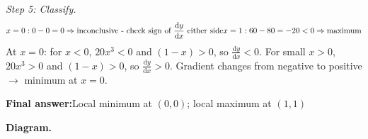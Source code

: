 \documentclass[11pt]{article}
\begin{document}
\textit{Step 5: Classify.}
\[\begin{gathered}
x=0: 0 - 0 = 0 \Rightarrow \text{inconclusive - check sign of } \frac{\mathrm{d}y}{\mathrm{d}x} \text{ either side} \newline x=1: 60 - 80 = -20 < 0 \Rightarrow \text{maximum}
\end{gathered}\]
At \( x = 0 \): for \( x < 0 \), \( 20x^3 < 0 \) and \( (1-x) > 0 \), so \( \frac{\mathrm{d}y}{\mathrm{d}x} < 0 \). For small \( x > 0 \), \( 20x^3 > 0 \) and \( (1-x) > 0 \), so \( \frac{\mathrm{d}y}{\mathrm{d}x} > 0 \). Gradient changes from negative to positive $\to$ minimum at \( x = 0 \).

\begin{answerbox}
\textbf{Final answer:}\quad Local minimum at \(\displaystyle  (0, 0) \); local maximum at \(\displaystyle  (1, 1) \)
\end{answerbox}
\textbf{Diagram.}
\end{document}
